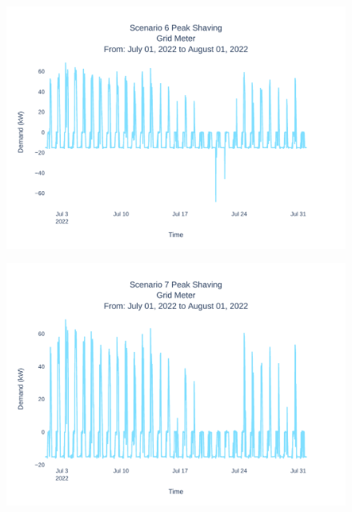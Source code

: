\documentclass[conference]{IEEEtran}
\begin{document}
	
	\begin{figure}[H]
		\centering
		\includegraphics[width=1\linewidth]{Fig/scenario_6_peak_shaving}
		\caption{}
		\label{fig:scenario3peakshaving}
	\end{figure}
	
	\begin{figure}[H]
		\centering
		\includegraphics[width=1\linewidth]{Fig/scenario_7_peak_shaving}
		\caption{}
		\label{fig:scenario4peakshaving}
	\end{figure}
\end{document}
